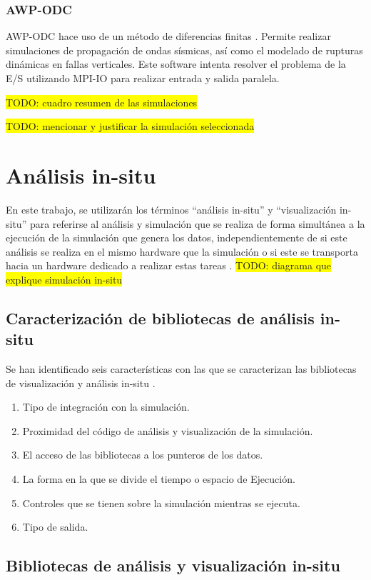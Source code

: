 \subsubsection{AWP-ODC}
AWP-ODC hace uso de un método de diferencias finitas \cite{Cui2010}. Permite realizar simulaciones de propagación de ondas sísmicas, así como el modelado de rupturas dinámicas en fallas verticales. Este software intenta resolver el problema de la E/S utilizando MPI-IO para realizar entrada y salida paralela.


\colorbox{yellow}{TODO: cuadro resumen de las simulaciones}

\colorbox{yellow}{TODO: mencionar y justificar la simulación seleccionada}
\section{Análisis in-situ}
En este trabajo, se utilizarán los términos ``análisis in-situ'' y ``visualización in-situ'' para referirse al análisis y simulación que se realiza de forma simultánea a la ejecución de la simulación que genera los datos, independientemente de si este análisis se realiza en el mismo hardware que la simulación o si este se transporta hacia un hardware dedicado a realizar estas tareas \cite{childs_terminology_2020}.
\colorbox{yellow}{TODO: diagrama que explique simulación in-situ}
\subsection{Caracterización de bibliotecas de análisis in-situ}
Se han identificado seis características con las que se caracterizan las bibliotecas de visualización y análisis in-situ \cite{childs_terminology_2020}.
\begin{enumerate}
  \item Tipo de integración con la simulación.
  \item Proximidad del código de análisis y visualización de la simulación.
  \item El acceso de las bibliotecas a los punteros de los datos.
  \item La forma en la que se divide el tiempo o espacio de Ejecución.
  \item Controles que se tienen sobre la simulación mientras se ejecuta.
  \item Tipo de salida.
\end{enumerate}
\subsection{Bibliotecas de análisis y visualización in-situ}
